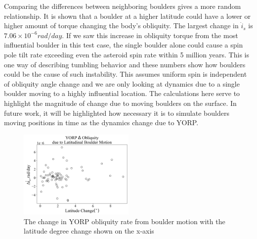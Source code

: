 Comparing the differences between neighboring boulders gives a more random relationship. It is shown that a boulder at a higher latitude could have a lower or higher amount of torque changing the body's obliquity. The largest change in $\dot{i}_s$ is $7.06\times 10^{-6} rad/day$. If we saw this increase in obliquity torque from the most influential boulder in this test case, the single boulder alone could cause a spin pole tilt rate exceeding even the asteroid spin rate within 5 million years. This is one way of describing tumbling behavior and these numbers show how boulders could be the cause of such instability.
This assumes uniform spin is independent of obliquity angle change and we are only looking at dynamics due to a single boulder moving to a highly influential location. The calculations here serve to highlight the magnitude of change due to moving boulders on the surface. In future work, it will be highlighted how necessary it is to simulate boulders moving positions in time as the dynamics change due to YORP.
\begin{figure}[H]
    \centering
    \includegraphics[width=0.5\textwidth]{fig/obliq_delta_boulder_motion_bennu.png}
    \caption{The change in YORP obliquity rate from boulder motion with the latitude degree change shown on the x-axis}
    \label{fig:ob_motion_delta}
\end{figure}















